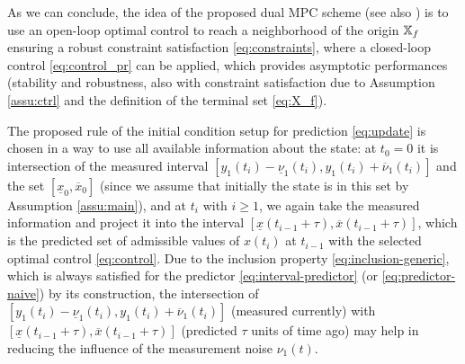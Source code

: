 \documentclass[letterpaper, 10 pt, conference]{ieeeconf}  %
\begin{document}
As we can conclude, the idea of the proposed dual MPC scheme (see
also \cite{Michalska1993,MPC1,MPC:Tube2}) is to use an open-loop
optimal control to reach a neighborhood of the origin $\mathbb{X}_{f}$ ensuring
a robust constraint satisfaction \eqref{eq:constraints}, where a
closed-loop control \eqref{eq:control_pr} can be applied, which provides
asymptotic performances (stability and robustness, also with constraint
satisfaction due to Assumption \ref{assu:ctrl} and the definition
of the terminal set \eqref{eq:X_f}). 

The proposed rule of the initial condition setup for prediction \eqref{eq:update}
is chosen in a way to use all available information about the state:
at $t_{0}=0$ it is intersection of the measured interval $[y_{1}(t_{i})-\underline{\nu}_{1}(t_{i}),y_{1}(t_{i})+\overline{\nu}_{1}(t_{i})]$
and the set $[\underline{x}_{0},\overline{x}_{0}]$ (since we assume
that initially the state is in this set by Assumption \ref{assu:main}),
and at $t_{i}$ with $i\geq1$, we again take the measured information
and project it into the interval $[\underline{x}(t_{i-1}+\tau),\overline{x}(t_{i-1}+\tau)]$,
which is the predicted set of admissible values of $x(t_{i})$ at
$t_{i-1}$ with the selected optimal control \eqref{eq:control}.
Due to the inclusion property \eqref{eq:inclusion-generic}, which
is always satisfied for the predictor \eqref{eq:interval-predictor}
(or \eqref{eq:predictor-naive}) by its construction, the intersection
of $[y_{1}(t_{i})-\underline{\nu}_{1}(t_{i}),y_{1}(t_{i})+\overline{\nu}_{1}(t_{i})]$
(measured currently) with $[\underline{x}(t_{i-1}+\tau),\overline{x}(t_{i-1}+\tau)]$
(predicted $\tau$ units of time ago) may help in reducing the influence
of the measurement noise $\nu_{1}(t)$.
\end{document}
